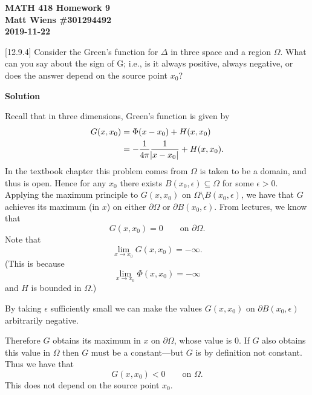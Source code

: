 \documentclass{article}
\begin{document}
\textbf{MATH 418 Homework 9} \\
\textbf{Matt Wiens \#301294492} \\
\textbf{2019-11-22}

[12.9.4] Consider the Green's function for $\Delta$ in three space and a
region $\Omega$. What can you say about the sign of G; i.e., is it
always positive, always negative, or does the answer depend on the
source point $x_0$?

\textbf{Solution}

Recall that in three dimensions, Green's function is given by
%
\begin{align*}
    G(x, x_0)
        &= \Phi(x - x_0) + H(x, x_0) \\
        &= - \frac{1}{4 \pi} \frac{1}{\envert{x - x_0}} + H(x, x_0)
        .
\end{align*}
%
In the textbook chapter this problem comes from $\Omega$ is taken to be
a domain, and thus is open. Hence for any $x_0$ there exists $B(x_0,
\epsilon) \subseteq \Omega$ for some $\epsilon > 0$. Applying the
maximum principle to $G(x, x_0)$ on $\Omega \setminus B(x_0, \epsilon)$,
we have that $G$ achieves its maximum (in $x$) on either $\partial
\Omega$ or $\partial B(x_0, \epsilon)$. From lectures, we know that
%
\begin{equation*}
    G(x, x_0) = 0 \qquad \text{on } \partial \Omega
    .
\end{equation*}
%
Note that
%
\begin{equation*}
    \lim_{x \to x_0} G(x, x_0) = - \infty
    .
\end{equation*}
%
(This is because
%
\begin{equation*}
    \lim_{x \to x_0} \Phi(x, x_0) = - \infty
\end{equation*}
%
and $H$ is bounded in $\Omega$.)

By taking $\epsilon$ sufficiently small we can make the values $G(x,
x_0)$ on $\partial B(x_0, \epsilon)$ arbitrarily negative.

Therefore $G$ obtains its maximum in $x$ on $\partial \Omega$, whose
value is $0$. If $G$ also obtains this value in $\Omega$ then $G$ must
be a constant---but $G$ is by definition not constant. Thus we have that
%
\begin{equation*}
    G(x, x_0) < 0 \qquad \text{on } \Omega
    .
\end{equation*}
%
This does not depend on the source point $x_0$.

\newpage
\end{document}
